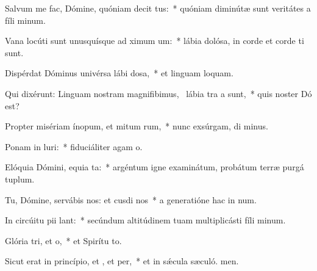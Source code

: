 \item Salvum me fac, Dómine, quóniam decit tus:~* quóniam diminútæ sunt veritátes a fíli minum.
\item Vana locúti sunt unusquísque ad ximum um:~* lábia dolósa, in corde et corde ti sunt.
\item Dispérdat Dóminus univérsa lábi dosa,~* et linguam loquam.
\item Qui dixérunt: Linguam nostram magnifibimus,~\pscross{} lábia tra a  sunt,~* quis noster Dó est?
\item Propter misériam ínopum, et mitum rum,~* nunc exsúrgam, di minus.
\item Ponam in luri:~* fiduciáliter agam  o.
\item Elóquia Dómini, equia ta:~* argéntum igne examinátum, probátum terræ purgá tuplum.
\item Tu, Dómine, servábis nos: et cusdi nos~* a generatióne hac in num.
\item In circúitu pii lant:~* secúndum altitúdinem tuam multiplicásti fíli minum.
\item Glória tri, et o,~* et Spirítu to.
\item Sicut erat in princípio, et , et per,~* et in sǽcula sæculó. men.
